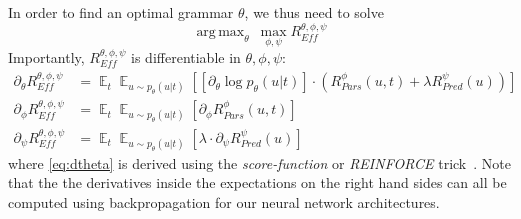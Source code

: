 \documentclass[10pt,twoside,lineno]{article}
\DeclareMathOperator*{\argmax}{arg\,max}
\DeclareMathOperator{\E}{\mathop{\mathbb{E}}}
\begin{document}
%
In order to find an optimal grammar $\theta$, we thus need to solve
\begin{equation}\label{eq:efficiency}
\argmax_\theta\	\max_{\phi, \psi} R_{\textit{Eff}}^{\theta, \phi, \psi} %
\end{equation}
Importantly, $R_{\textit{Eff}}^{\theta, \phi, \psi}$ is differentiable in $\theta, \phi, \psi$: %
\begin{align}
\partial_\theta R_{\textit{Eff}}^{\theta, \phi, \psi} &= \E_t \E_{u \sim p_\theta(u|t)} \left[  \left[\partial_\theta \log p_\theta(u|t)\right] \cdot    \left(R_{Pars}^{\phi}(u,t) + \lambda R_{Pred}^{\psi}(u)\right) \right] \label{eq:dtheta}\\ 
\partial_\phi R_{\textit{Eff}}^{\theta, \phi, \psi} &= \E_t \E_{u \sim p_\theta(u|t)}  \left[\partial_\phi R_{Pars}^{\phi}(u,t)\right] \\
\partial_\psi R_{\textit{Eff}}^{\theta, \phi, \psi} &= \E_t \E_{u \sim p_\theta(u|t)}  \left[\lambda \cdot \partial_\psi R_{Pred}^{\psi}(u)\right] \label{eq:dpsi}
\end{align}
where \ref{eq:dtheta} is derived using the \emph{score-function} or \emph{REINFORCE} trick~\cite{williams1992simple}.
Note that the the derivatives inside the expectations on the right hand sides can all be computed using backpropagation for our neural network architectures.
\end{document}
